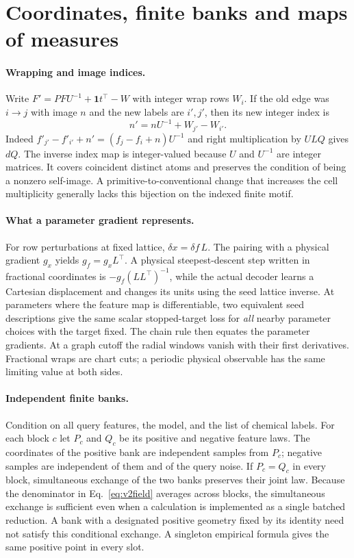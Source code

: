 \section{Coordinates, finite banks and maps of measures}
\paragraph{Wrapping and image indices.}
Write $F'=PFU^{-1}+\mathbf 1t^\top-W$ with integer wrap rows $W_i$. If the old edge was $i\to j$ with image $n$ and the new labels are $i',j'$, then its new integer index is
\[
 n'=nU^{-1}+W_{j'}-W_{i'} .
\]
Indeed $f'_{j'}-f'_{i'}+n'=(f_j-f_i+n)U^{-1}$ and right multiplication by $ULQ$ gives $dQ$. The inverse index map is integer-valued because $U$ and $U^{-1}$ are integer matrices. It covers coincident distinct atoms and preserves the condition of being a nonzero self-image. A primitive-to-conventional change that increases the cell multiplicity generally lacks this bijection on the indexed finite motif.

\paragraph{What a parameter gradient represents.}
For row perturbations at fixed lattice, $\delta x=\delta f\,L$. The pairing with a physical gradient $g_x$ yields $g_f=g_xL^\top$. A physical steepest-descent step written in fractional coordinates is $-g_f(LL^\top)^{-1}$, while the actual decoder learns a Cartesian displacement and changes its units using the seed lattice inverse. At parameters where the feature map is differentiable, two equivalent seed descriptions give the same scalar stopped-target loss for \emph{all} nearby parameter choices with the target fixed. The chain rule then equates the parameter gradients. At a graph cutoff the radial windows vanish with their first derivatives. Fractional wraps are chart cuts; a periodic physical observable has the same limiting value at both sides.

\paragraph{Independent finite banks.}
Condition on all query features, the model, and the list of chemical labels. For each block $c$ let $P_c$ and $Q_c$ be its positive and negative feature laws. The coordinates of the positive bank are independent samples from $P_c$; negative samples are independent of them and of the query noise. If $P_c=Q_c$ in every block, simultaneous exchange of the two banks preserves their joint law. Because the denominator in Eq.~\eqref{eq:v2field} averages across blocks, the simultaneous exchange is sufficient even when a calculation is implemented as a single batched reduction. A bank with a designated positive geometry fixed by its identity need not satisfy this conditional exchange. A singleton empirical formula gives the same positive point in every slot.

